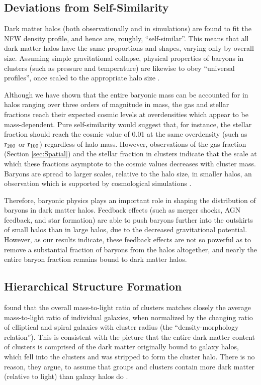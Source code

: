 \subsection{Deviations from Self-Similarity}
\label{sec:Implications.Invariance}

Dark matter halos (both observationally and in simulations) are found
to fit the NFW density profile, and hence are, roughly,
``self-similar''. This means that all dark matter halos have the same
proportions and shapes, varying only by overall size. Assuming simple
gravitational collapse, physical properties of baryons in clusters
(such as pressure and temperature) are likewise to obey ``universal
profiles'', once scaled to the appropriate halo size
.

Although we have shown that the entire baryonic mass can be accounted
for in halos ranging over three orders of magnitude in mass, the gas
and stellar fractions reach their expected cosmic levels at
overdensities which appear to be mass-dependent. Pure self-similarity
would suggest that, for instance, the stellar fraction should reach
the cosmic value of 0.01 at the same overdensity (such as $\textrm{r\ensuremath{_{200}}}$ or
$\textrm{r}{}_{100}$) regardless of halo mass. However, observations of
the gas fraction (Section \ref{sec:Spatial}) and the stellar fraction
\citep{Bahcall2014} in clusters indicate that the scale at which these
fractions asymptote to the cosmic values decreases with cluster
mass. Baryons are spread to larger scales, relative to the halo size,
in smaller halos, an observation which is supported by cosmological
simulations \citep{Battaglia2013}.

Therefore, baryonic physics plays an important role in shaping the
distribution of baryons in dark matter halos. Feedback effects (such
as merger shocks, AGN feedback, and star formation) are able to push
baryons further into the outskirts of small halos than in large halos,
due to the decreased gravitational potential. However, as our results
indicate, these feedback effects are not so powerful as to remove a
substantial fraction of baryons from the halos altogether, and nearly
the entire baryon fraction remains bound to dark matter halos.

\subsection{Hierarchical Structure Formation}
\label{sec:Implications.Hierarchical}

\citet{Bahcall2014} found that the overall mass-to-light ratio of
clusters matches closely the average mass-to-light ratio of individual
galaxies, when normalized by the changing ratio of elliptical and
spiral galaxies with cluster radius (the ``density-morphology
relation''). This is consistent with the picture that
the entire dark matter content of clusters is comprised of the dark
matter originally bound to galaxy halos, which fell into the clusters
and was stripped to form the cluster halo. There is no reason, they
argue, to assume that groups and clusters contain more dark matter (relative to
light) than galaxy halos do . 


